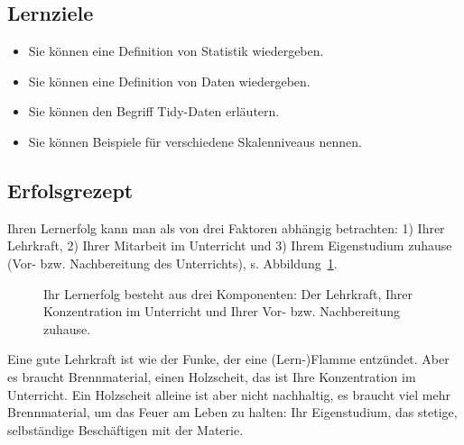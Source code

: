 \documentclass[
  a4paper,
]{scrbook}
\providecommand{\tightlist}{%
  \setlength{\itemsep}{0pt}\setlength{\parskip}{0pt}}\usepackage{longtable,booktabs,array}
\theoremstyle{definition}
\theoremstyle{definition}
\theoremstyle{definition}
\theoremstyle{remark}
\begin{document}
\subsection{Lernziele}\label{lernziele-1}

\begin{itemize}
\tightlist
\item
  Sie können eine Definition von Statistik wiedergeben.
\item
  Sie können eine Definition von Daten wiedergeben.
\item
  Sie können den Begriff Tidy-Daten erläutern.
\item
  Sie können Beispiele für verschiedene Skalenniveaus nennen.
\end{itemize}

\subsection{Erfolsgrezept}\label{erfolsgrezept}

Ihren Lernerfolg kann man als von drei Faktoren abhängig betrachten: 1)
Ihrer Lehrkraft, 2) Ihrer Mitarbeit im Unterricht und 3) Ihrem
Eigenstudium zuhause (Vor- bzw. Nachbereitung des Unterrichts), s.
Abbildung~\ref{fig-erfolgsrezept}.

\begin{figure}


\caption{\label{fig-erfolgsrezept}Ihr Lernerfolg besteht aus drei
Komponenten: Der Lehrkraft, Ihrer Konzentration im Unterricht und Ihrer
Vor- bzw. Nachbereitung zuhause.}

\end{figure}%

Eine gute Lehrkraft ist wie der Funke, der eine (Lern-)Flamme entzündet.
Aber es braucht Brennmaterial, einen Holzscheit, das ist Ihre
Konzentration im Unterricht. Ein Holzscheit alleine ist aber nicht
nachhaltig, es braucht viel mehr Brennmaterial, um das Feuer am Leben zu
halten: Ihr Eigenstudium, das stetige, selbständige Beschäftigen mit der
Materie.
\end{document}
